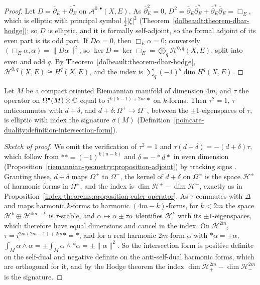 \begin{proof}
Let $D = \bar\partial_E + \bar\partial_E^*$ on $\mathcal{A}^{0,\bullet}(X, E)$. As $\bar\partial_E^2 = 0$, $D^2 = \bar\partial_E\bar\partial_E^* + \bar\partial_E^*\bar\partial_E = \Box_E$, which is elliptic with principal symbol $\frac12|\xi|^2$
(Theorem~\ref{dolbeault:theorem-dbar-hodge}); so $D$ is elliptic, and it is formally self-adjoint, so the formal adjoint of its even part is its odd part. If $D\alpha = 0$, then $\Box_E\alpha = 0$; conversely
$(\Box_E\alpha, \alpha) = \|D\alpha\|^2$, so $\ker D = \ker\Box_E = \bigoplus_q\mathcal{H}^{0,q}(X, E)$, split into even and odd $q$. By Theorem~\ref{dolbeault:theorem-dbar-hodge}, $\mathcal{H}^{0,q}(X, E) \cong H^q(X, E)$, and the index is
$\sum_q(-1)^q\dim H^q(X, E)$.
\end{proof}

\begin{proposition}\label{index-theorems:proposition-signature-operator}
Let $M$ be a compact oriented Riemannian manifold of dimension $4m$, and $\tau$ the operator on $\Omega^\bullet(M) \otimes \mathbb{C}$ equal to $i^{k(k-1)+2m}{*}$ on $k$-forms. Then $\tau^2 = 1$, $\tau$ anticommutes with $d + \delta$,
and $d + \delta \colon \Omega^+ \to \Omega^-$, between the $\pm1$-eigenspaces of $\tau$, is elliptic with index the signature $\sigma(M)$ (Definition~\ref{poincare-duality:definition-intersection-form}).
\end{proposition}

\begin{proof}[Sketch of proof]
We omit the verification of $\tau^2 = 1$ and $\tau(d + \delta) = -(d + \delta)\tau$, which follow from $** = (-1)^{k(n-k)}$ and $\delta = -{*}d{*}$ in even dimension (Proposition~\ref{riemannian-geometry:proposition-adjoint}) by
tracking signs \cite[Chapter 3]{lawson-michelsohn}. Granting these, $d + \delta$ maps $\Omega^+$ to $\Omega^-$, the kernel of $d + \delta$ on $\Omega^\pm$ is the space $\mathcal{H}^\pm$ of harmonic forms in $\Omega^\pm$, and the index is
$\dim\mathcal{H}^+ - \dim\mathcal{H}^-$, exactly as in Proposition~\ref{index-theorems:proposition-euler-operator}. As $\tau$ commutes with $\Delta$ and maps harmonic $k$-forms to harmonic $(4m - k)$-forms, for $k < 2m$ the space
$\mathcal{H}^k \oplus \mathcal{H}^{4m-k}$ is $\tau$-stable, and $\alpha \mapsto \alpha \pm \tau\alpha$ identifies $\mathcal{H}^k$ with its $\pm1$-eigenspaces, which therefore have equal dimensions and cancel in the index. On
$\mathcal{H}^{2m}$, $\tau = i^{2m(2m-1)+2m}{*} = *$, and for a real harmonic $2m$-form $\alpha$ with $*\alpha = \pm\alpha$, $\int_M\alpha \wedge \alpha = \pm\int_M\alpha \wedge *\alpha = \pm\|\alpha\|^2$. So the intersection form is positive definite on
the self-dual and negative definite on the anti-self-dual harmonic forms, which are orthogonal for it, and by the Hodge theorem the index $\dim\mathcal{H}^{2m}_+ - \dim\mathcal{H}^{2m}_-$ is the signature.
\end{proof}

